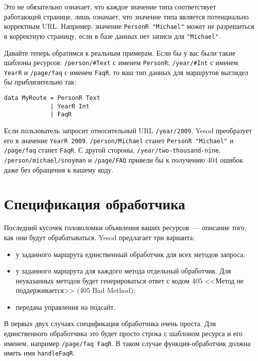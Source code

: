 \begin{remark}
  Это не обязательно означает, что каждое значение типа соответствует работающей странице,
  лишь означает, что значение типа является потенциально корректным URL. Например,
  значение \lstinline!PersonR "Michael"! может не разрешиться в корректную страницу, если
  в базе данных нет записи для \lstinline!"Michael"!.
\end{remark}

Давайте теперь обратимся к реальным примерам. Если бы у вас были такие
шаблоны ресурсов: \lstinline!/person/#Text! с именем
\lstinline!PersonR!; \lstinline!/year/#Int! с именем
\lstinline!YearR! и \lstinline!/page/faq! с именем \lstinline!FaqR!,
то ваш тип данных для маршрутов выглядел бы приблизительно так:
\begin{lstlisting}
data MyRoute = PersonR Text
             | YearR Int
             | FaqR
\end{lstlisting}

Если пользователь запросит относительный URL \lstinline!/year/2009!,
Yesod преобразует его в значение \lstinline!YearR 2009!.
\lstinline!/person/Michael! станет \lstinline!PersonR "Michael"!
и \lstinline!/page/faq! станет \lstinline!FaqR!. С другой
стороны, \lstinline!/year/two-thousand-nine!,
\lstinline!/person/michael/snoyman! и \lstinline!/page/FAQ! привели бы
к получению 404 ошибок даже без обращения к вашему коду.

\section{Спецификация обработчика}
Последний кусочек головоломки объявления ваших ресурсов~--- описание
того, как они будут обрабатываться. Yesod предлагает три варианта:
\begin{itemize}
\item у заданного маршрута единственный обработчик для всех методов запроса;
\item у заданного маршрута для каждого метода отдельный
  обработчик. Для неуказанных методов будет генерироваться ответ с
  кодом 405 <<Метод не поддерживается>> (405 Bad Method);
\item передача управления на подсайт.
\end{itemize}

В первых двух случаях спецификация обработчика очень проста. Для
единственного обработчика это будет просто строка с шаблоном ресурса и
его именем, например \lstinline!/page/faq FaqR!. В таком
случае функция-обработчик должна иметь имя \lstinline!handleFaqR!.

